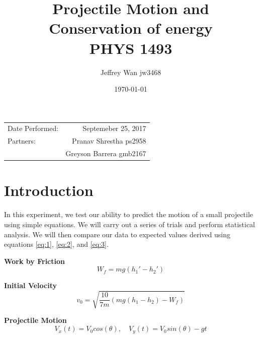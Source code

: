 \documentclass{article}
\title{Projectile Motion and Conservation of energy \\ PHYS 1493} %
\author{Jeffrey Wan jw3468} %
\date{\today} %
\begin{document}
\maketitle %

\begin{center}
\begin{tabular}{l r}
Date Performed: & Septemeber 25, 2017 \\ %
Partners: & Pranav Shrestha ps2958\\ %
& Greyson Barrera gmb2167\\
\end{tabular}
\end{center}



\section{Introduction}

In this experiment, we test our ability to predict the motion of a small projectile using simple equations. We will carry out a series of trials and perform statistical analysis. We will then compare our data to expected values derived using equations \eqref{eq:1}, \eqref{eq:2}, and \eqref{eq:3}.

\hspace{1cm}

\textbf{Work by Friction}
\begin{equation}\label{eq:1} 
    W_{f} = mg(h_{1}\ensuremath{'} - h_{2}\ensuremath{'})
\end{equation}

\textbf{Initial Velocity}
\begin{equation}\label{eq:2}
    v_{0} = \sqrt{\frac{10}{7m}(mg(h_{1}-h_{2})-W_{f})}
\end{equation}

\textbf{Projectile Motion}
\begin{equation}\label{eq:3} 
    V_{x}(t) = V_{0} cos(\theta), \quad V_{y}(t) = V_{0} sin(\theta) - gt
\end{equation}
\end{document}
